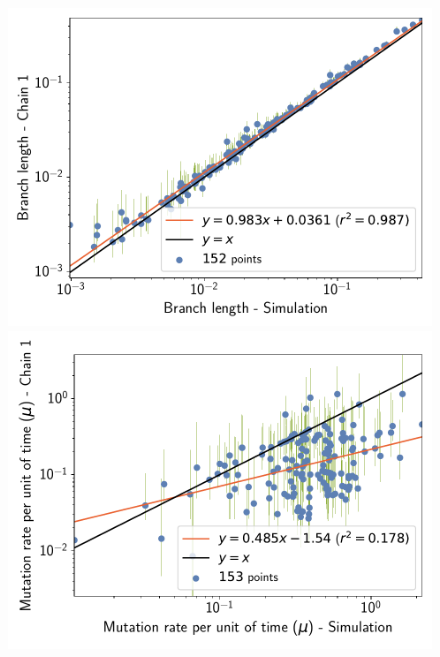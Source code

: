 \documentclass{article}
\begin{document}
	\begin{figure}[H]
		\centering
		\begin{minipage}{0.32\linewidth}
			\includegraphics[width=\linewidth, page=1]{simulations/SimuPoly_SiteMutSelBranchNe_BranchCorrelation_Log10BranchLength}
		\end{minipage} \hfill
		\begin{minipage}{0.32\linewidth}
			\includegraphics[width=\linewidth, page=1]{simulations/SimuPoly_SiteMutSelBranchNe_BranchCorrelation_LogMutationRatePerTime}
		\end{minipage} \hfill
		\begin{minipage}{0.32\linewidth}

\end{minipage}
\end{figure}
\end{document}

